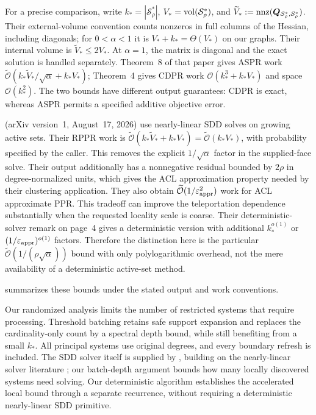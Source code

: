 For a precise comparison, write $k_*=|\mathcal S_\rho^*|$,
$V_*=\operatorname{vol}(\mathcal S_\rho^*)$, and
$\widetilde V_*:=\operatorname{nnz}(\bm{Q}_{\mathcal S_\rho^*,\mathcal S_\rho^*})$.
Their external-volume convention counts nonzeros in full columns of the
Hessian, including diagonals; for $0<\alpha<1$ it is
$V_*+k_*=\Theta(V_*)$ on our graphs. Their internal volume is
$\widetilde V_*\leq2V_*$. At $\alpha=1$, the matrix is diagonal and the
exact solution is handled separately.
Theorem~8 of that paper gives ASPR work
$\widetilde{\mathcal{O}}(k_*\widetilde V_*/\sqrt\alpha+k_*V_*)$;
Theorem~4 gives CDPR work $\mathcal{O}(k_*^3+k_*V_*)$ and space $\mathcal{O}(k_*^2)$.
The two bounds have different output guarantees: CDPR is exact,
whereas ASPR permits a specified additive objective error.

\citet[Theorem~1.3]{wei2026simple} (arXiv version~1, August~17, 2026) use nearly-linear SDD solves on growing
active sets. Their RPPR work is
$\widetilde{\mathcal{O}}(k_*\widetilde V_*+k_*V_*)=\widetilde{\mathcal{O}}(k_*V_*)$,
with probability specified by the caller. This removes the explicit
$1/\sqrt\alpha$ factor in the supplied-face solve. Their output additionally
has a nonnegative residual bounded by $2\rho$ in degree-normalized units,
which gives the ACL approximation property needed by their clustering
application. They also obtain $\widetilde{\mathcal{O}}(1/\varepsilon_{\mathrm{appr}}^2)$ work for ACL
approximate PPR. This tradeoff can improve the teleportation dependence
substantially when the requested locality scale is coarse.
Their deterministic-solver remark on page~4 gives a deterministic version
with additional $k_*^{o(1)}$ or $(1/\varepsilon_{\mathrm{appr}})^{o(1)}$ factors. Therefore
the distinction here is the particular
$\widetilde{\mathcal{O}}(1/(\rho\sqrt\alpha))$ bound with only polylogarithmic
overhead, not the mere availability of a deterministic active-set method.

 summarizes these bounds under the stated output and
work conventions.


Our randomized analysis limits the number of restricted systems that require
processing. Threshold batching retains safe support expansion and replaces
the cardinality-only count by a spectral depth bound, while still benefiting
from a small $k_*$. All principal systems use original degrees, and every
boundary refresh is included. The SDD solver itself is supplied by
\citet{koutis2011nearly}, building on the nearly-linear solver literature
\citep{spielman2004nearly}; our batch-depth argument bounds how many
locally discovered systems need solving. Our deterministic algorithm
establishes the accelerated local bound through a separate recurrence,
without requiring a deterministic nearly-linear SDD primitive.

